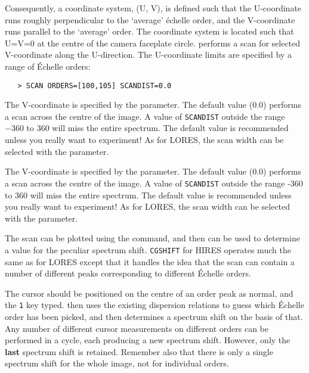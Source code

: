 Consequently, a coordinate system, (U, V), is defined such that the
U-coordinate runs roughly perpendicular to the `average' \'{e}chelle order, and
the V-coordinate runs parallel to the `average' order.  The coordinate system
is located such that U=V=0 at the centre of the camera faceplate circle.
 performs a scan for selected V-coordinate along the
U-direction.  The U-coordinate limits are specified by a range of \'{E}chelle
orders:

\begin{verbatim}
   > SCAN ORDERS=[100,105] SCANDIST=0.0
\end{verbatim}

\begin{latexonly}
The V-coordinate is specified by the 
 parameter.  The default
value (0.0) performs a scan across the centre of the image.  A value of
\verb+SCANDIST+ outside the range $-360$ to 360 will miss the entire spectrum.
The default value is recommended unless you really want to experiment\@!  As for
LORES, the scan width can be selected with the 
 parameter.
\end{latexonly}

\begin{htmlonly}
The V-coordinate is specified by the 
 parameter.  The default
value (0.0) performs a scan across the centre of the image.  A value of
\verb+SCANDIST+ outside the range -360 to 360 will miss the entire spectrum.
The default value is recommended unless you really want to experiment\@!  As for
LORES, the scan width can be selected with the 
 parameter.
\end{htmlonly}

The scan can be plotted using the 
 command, and then
 can be used to determine a value for the peculiar spectrum shift.
\verb+CGSHIFT+ for HIRES operates much the same as for LORES except that it
handles the idea that the scan can contain a number of different peaks
corresponding to different \'{E}chelle orders.

The cursor should be positioned on the centre of an order peak as normal, and
the \verb+1+ key typed.  
 then uses the existing dispersion
relations to guess which \'{E}chelle order has been picked, and then determines a
spectrum shift on the basis of that.  Any number of different cursor
measurements on different orders can be performed in a cycle, each producing a
new spectrum shift.  However, only the {\bf last} spectrum shift is retained.
Remember also that there is only a single spectrum shift for the whole image,
not for individual orders.

